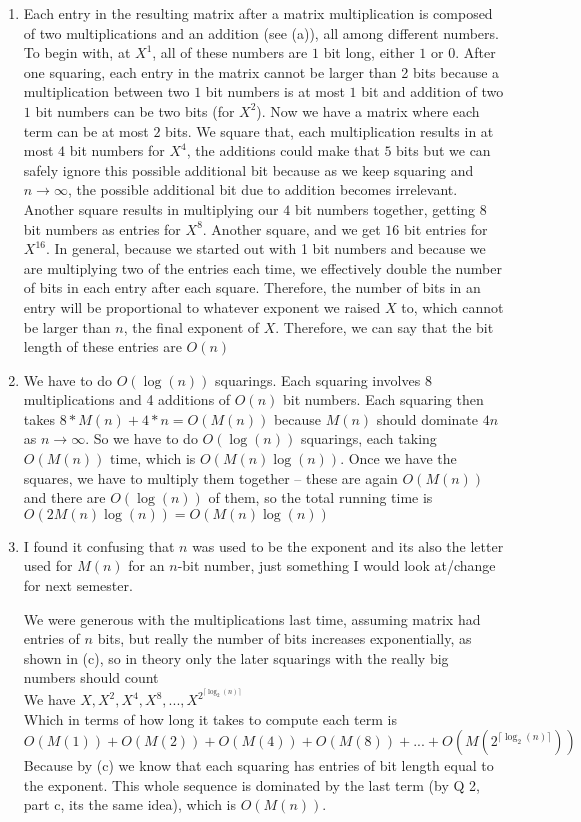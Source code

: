 \documentclass[11pt]{article}
\begin{document}
\begin{enumerate}
\begin{enumerate}
\item 
Each entry in the resulting matrix after a matrix multiplication is composed of two multiplications and an addition (see (a)), all among different numbers. To begin with, at $X^1$, all of these numbers are $1$ bit long, either $1$ or $0$. After one squaring, each entry in the matrix cannot be larger than 2 bits because a multiplication between two $1$ bit numbers is at most $1$ bit and addition of two $1$ bit numbers can be two bits (for $X^2$). Now we have a matrix where each term can be at most $2$ bits. We square that, each multiplication results in at most $4$ bit numbers for $X^4$, the additions could make that $5$ bits but we can safely ignore this possible additional bit because as we keep squaring and $n\to\infty$, the possible additional bit due to addition becomes irrelevant. Another square results in multiplying our $4$ bit numbers together, getting $8$ bit numbers as entries for $X^8$. Another square, and we get $16$ bit entries for $X^{16}$. In general, because we started out with 1 bit numbers and because we are multiplying two of the entries each time, we effectively double the number of bits in each entry after each square. Therefore, the number of bits in an entry will be proportional to whatever exponent we raised $X$ to, which cannot be larger than $n$, the final exponent of $X$. Therefore, we can say that the bit length of these entries are $O(n)$

\item 
We have to do $O(\log(n))$ squarings. Each squaring involves 8 multiplications and 4 additions of $O(n)$ bit numbers. Each squaring then takes $8*M(n)+4*n=O(M(n))$ because $M(n)$ should dominate $4n$ as $n\to\infty$. So we have to do $O(\log(n))$ squarings, each taking $O(M(n))$ time, which is $O(M(n)\log(n))$. Once we have the squares, we have to multiply them together --  these are again $O(M(n))$ and there are $O(\log(n))$ of them, so the total running time is $O(2M(n)\log(n))=O(M(n)\log(n))$

\item 
I found it confusing that $n$ was used to be the exponent and its also the letter used for $M(n)$ for an $n$-bit number, just something I would look at/change for next semester.

We were generous with the multiplications last time, assuming matrix had entries of $n$ bits, but really the number of bits increases exponentially, as shown in (c), so in theory only the later squarings with the really big numbers should count \\
We have 
$X, X^2, X^4, X^8,...,X^{2^{\lceil \log_2(n)\rceil }}$\\
Which in terms of how long it takes to compute each term is\\
$O(M(1))+O(M(2))+O(M(4))+O(M(8))+...+O(M(2^{\lceil \log_2(n)\rceil }))$\\
Because by (c) we know that each squaring has entries of bit length equal to the exponent. This whole sequence is dominated by the last term (by Q 2, part c, its the same idea), which is $O(M(n))$. 


\end{enumerate}
\end{enumerate}
\end{document}
